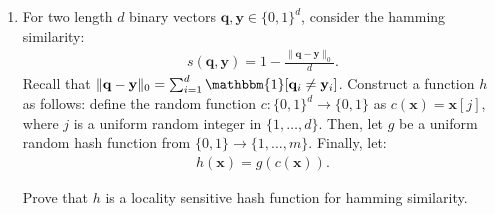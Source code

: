 \documentclass[10pt]{article}
\newcommand{\bv}[1]{\mathbf{#1}}
\newcommand{\E}{\mathbb{E}}
\begin{document}
\begin{enumerate}

\item For two length $d$ binary vectors $\bv{q},\bv{y} \in \{0,1\}^d$, consider the hamming similarity: 
\begin{align*}
	s(\bv{q},\bv{y}) = 1 - \frac{\|\bv{q} - \bv{y}\|_0}{d}.
\end{align*} 
Recall that $\|\bv{q} - \bv{y}\|_0 = \sum_{i=1}^d \mathbbm{1}[\bv{q}_i \neq \bv{y}_i]$.
Construct a function $h$ as follows:
	define the random function $c: \{0,1\}^d \rightarrow \{0,1\}$ as $c(\bv{x}) = \bv{x}[j]$, where $j$ is a uniform random integer in $\{1, \ldots, d\}$. Then, let $g$ be a uniform random hash function from $\{0,1\} \rightarrow \{1, \ldots, m\}$. Finally, let:
	\begin{align*}
		h(\bv{x}) = g(c(\bv{x})).
	\end{align*}
	
	 Prove that $h$ is a locality sensitive hash function for {hamming similarity}. 
	\end{enumerate}
	
	
	
	
\end{document}
